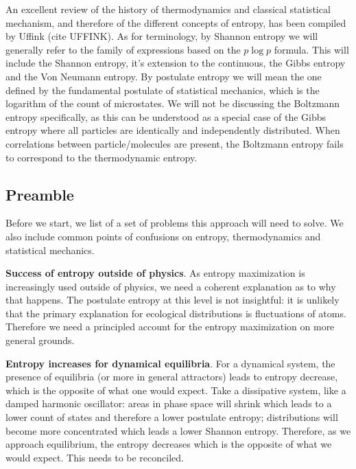 \documentclass[10pt, onecolumn, longbibliography, nofootinbib]{revtex4-2}
\begin{document}
An excellent review of the history of thermodynamics and classical statistical mechanism, and therefore of the different concepts of entropy, has been compiled by Uffink (cite UFFINK). As for terminology, by Shannon entropy we will generally refer to the family of expressions based on the $p \log p$ formula. This will include the Shannon entropy, it's extension to the continuous, the Gibbs entropy and the Von Neumann entropy. By postulate entropy we will mean the one defined by the fundamental postulate of statistical mechanics, which is the logarithm of the count of microstates. We will not be discussing the Boltzmann entropy specifically, as this can be understood as a special case of the Gibbs entropy where all particles are identically and independently distributed. When correlations between particle/molecules are present, the Boltzmann entropy fails to correspond to the thermodynamic entropy.

\subsection{Preamble}

Before we start, we list of a set of problems this approach will need to solve. We also include common points of confusions on entropy, thermodynamics and statistical mechanics.

\textbf{Success of entropy outside of physics}. As entropy maximization is increasingly used outside of physics, we need a coherent explanation as to why that happens. The postulate entropy at this level is not insightful: it is unlikely that the primary explanation for ecological distributions is fluctuations of atoms. Therefore we need a principled account for the entropy maximization on more general grounds.

\textbf{Entropy increases for dynamical equilibria}. For a dynamical system, the presence of equilibria (or more in general attractors) leads to entropy decrease, which is the opposite of what one would expect. Take a dissipative system, like a damped harmonic oscillator: areas in phase space will shrink which leads to a lower count of states and therefore a lower postulate entropy; distributions will become more concentrated which leads a lower Shannon entropy. Therefore, as we approach equilibrium, the entropy decreases which is the opposite of what we would expect. This needs to be reconciled.
\end{document}
